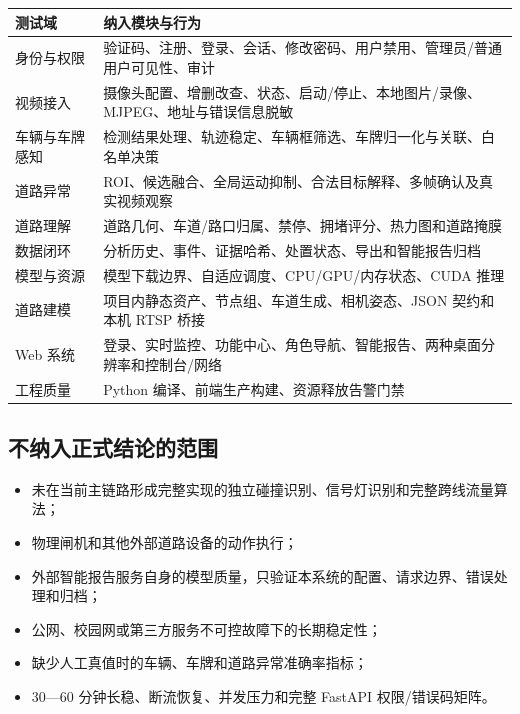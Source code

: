 \begin{longtable}[]{@{}
  >{\raggedright\arraybackslash}p{}
  >{\raggedright\arraybackslash}p{}@{}}
\toprule\noalign{}
\begin{minipage}[b]{\linewidth}\raggedright
测试域
\end{minipage} & \begin{minipage}[b]{\linewidth}\raggedright
纳入模块与行为
\end{minipage} \\
\midrule\noalign{}
\endhead
\bottomrule\noalign{}
\endlastfoot
身份与权限 & 验证码、注册、登录、会话、修改密码、用户禁用、管理员/普通用户可见性、审计 \\
视频接入 & 摄像头配置、增删改查、状态、启动/停止、本地图片/录像、MJPEG、地址与错误信息脱敏 \\
车辆与车牌感知 & 检测结果处理、轨迹稳定、车辆框筛选、车牌归一化与关联、白名单决策 \\
道路异常 & ROI、候选融合、全局运动抑制、合法目标解释、多帧确认及真实视频观察 \\
道路理解 & 道路几何、车道/路口归属、禁停、拥堵评分、热力图和道路掩膜 \\
数据闭环 & 分析历史、事件、证据哈希、处置状态、导出和智能报告归档 \\
模型与资源 & 模型下载边界、自适应调度、CPU/GPU/内存状态、CUDA 推理 \\
道路建模 & 项目内静态资产、节点组、车道生成、相机姿态、JSON 契约和本机 RTSP 桥接 \\
Web 系统 & 登录、实时监控、功能中心、角色导航、智能报告、两种桌面分辨率和控制台/网络 \\
工程质量 & Python 编译、前端生产构建、资源释放告警门禁 \\
\end{longtable}

\subsection{不纳入正式结论的范围}\label{test-ux4e0dux7eb3ux5165ux6b63ux5f0fux7ed3ux8bbaux7684ux8303ux56f4}

\begin{itemize}
\tightlist
\item
  未在当前主链路形成完整实现的独立碰撞识别、信号灯识别和完整跨线流量算法；
\item
  物理闸机和其他外部道路设备的动作执行；
\item
  外部智能报告服务自身的模型质量，只验证本系统的配置、请求边界、错误处理和归档；
\item
  公网、校园网或第三方服务不可控故障下的长期稳定性；
\item
  缺少人工真值时的车辆、车牌和道路异常准确率指标；
\item
  30---60 分钟长稳、断流恢复、并发压力和完整 FastAPI 权限/错误码矩阵。
\end{itemize}

